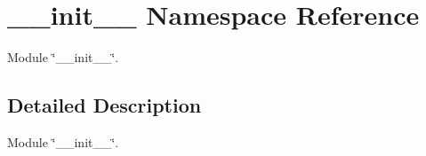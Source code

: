 \section{\_\-\_\-init\_\-\_\- Namespace Reference}
\label{namespace____init____}
Module \char`\"{}\_\-\_\-init\_\-\_\-\char`\"{}.  




\subsection{Detailed Description}
Module \char`\"{}\_\-\_\-init\_\-\_\-\char`\"{}. 